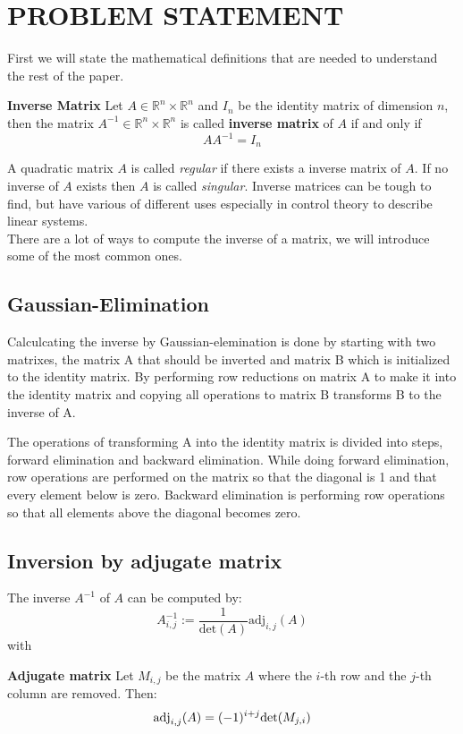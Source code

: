 

\section{PROBLEM STATEMENT}\label{sec:problem}
First we will state the mathematical definitions that are needed to understand the rest of the paper.
\begin{definition}
	\textbf{Inverse Matrix}
	Let $A \in \mathbb{R}^n \times \mathbb{R}^n$ and $I_n$ be the identity matrix of dimension $n$, then the matrix $A^{-1} \in \mathbb{R}^n \times \mathbb{R}^n$ is called \textbf{inverse matrix} of $A$ if and only if
	\begin{equation}\label{eq:inverse}
	AA^{-1} = I_n
	\end{equation}
\end{definition}
A quadratic matrix $A$ is called \emph{regular} if there exists a inverse matrix of $A$. If no inverse of $A$ exists then $A$ is called \emph{singular}. Inverse matrices can be tough to find, but have various of different uses especially in control theory to describe linear systems.  
\vspace{0.2cm}\\
There are a lot of ways to compute the inverse of a matrix, we will introduce some of the most common ones.\\
\subsection*{Gaussian-Elimination}
Calculcating the inverse by Gaussian-elemination is done by starting with two matrixes, the matrix A that should be inverted and matrix B which is initialized to the identity matrix. By performing row reductions on matrix A to make it into the identity matrix and copying all operations to matrix B transforms B to the inverse of A.

The operations of transforming A into the identity matrix is divided into steps, forward elimination and backward elimination.
While doing forward elimination, row operations are performed on the matrix so that the diagonal is 1 and that every element below is zero.
Backward elimination is performing row operations so that all elements above the diagonal becomes zero.

\subsection*{Inversion by adjugate matrix}
The inverse $A^{-1}$ of $A$ can be computed by:
\begin{equation}
	A^{-1}_{i,j} := \frac{1}{\text{det}(A)} \text{adj}_{i,j}(A)
\end{equation}
with
\begin{definition}
	\textbf{Adjugate matrix} Let $M_{i,j}$ be the matrix $A$ where the $i$-th row and the $j$-th column are removed. Then:
	\[ \text{\textnormal{adj}}_{i,j}(A) = (-1)^{i+j} \text{\textnormal{det}}(M_{j,i}) \]
\end{definition}

